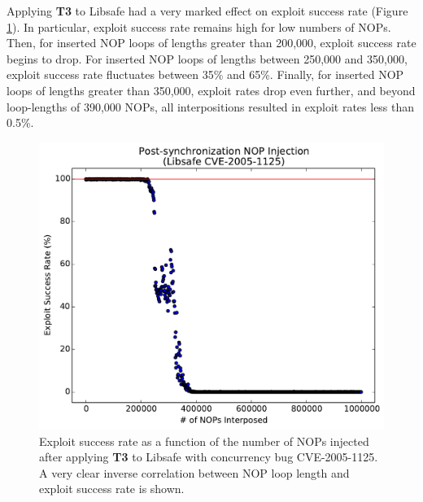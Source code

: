 Applying \textbf{T3} to Libsafe had a very marked effect on exploit success rate (Figure \ref{fig_libsafe-post}).
In particular, exploit success rate remains high for low numbers of NOPs.
Then, for inserted NOP loops of lengths greater than 200,000, exploit success rate begins to drop.
For inserted NOP loops of lengths between 250,000 and 350,000, exploit success rate fluctuates between 35\% and 65\%.
Finally, for inserted NOP loops of lengths greater than 350,000, exploit rates drop even further, and beyond loop-lengths of 390,000 NOPs, all interpositions resulted in exploit rates less than 0.5\%.
\begin{figure}
	\centering
	\includegraphics[width=\columnwidth]{figures/libsafe-post}
	\caption{
		Exploit success rate as a function of the number of NOPs injected after applying \textbf{T3} to Libsafe with concurrency bug CVE-2005-1125.
		A very clear inverse correlation between NOP loop length and exploit success rate is shown.
	}
	\label{fig_libsafe-post}
\end{figure}

